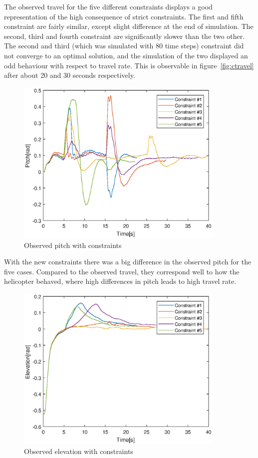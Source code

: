 The observed travel for the five different constraints displays a good representation of the high consequence of strict constraints. The first and fifth constraint are fairly similar, except slight difference at the end of simulation. The second, third and fourth constraint are significantly slower than the two other. The second and third (which was simulated with 80 time steps) constraint did not converge to an optimal solution, and the simulation of the two displayed an odd behaviour with respect to travel rate. This is observable in figure~\ref{fig:ctravel} after about 20 and 30 seconds respectively. 

\begin{figure}[H]
\includegraphics[width=1\linewidth, height=8cm]{data_10.4/constraints_p_eps.eps} 
\centering
\caption{Observed pitch with constraints}\label{fig:cpitch}
\end{figure}

With the new constraints there was a big difference in the observed pitch for the five cases. Compared to the observed travel, they correspond well to how the helicopter behaved, where high differences in pitch leads to high travel rate. 

\begin{figure}[H]
\includegraphics[width=1\linewidth, height=8cm]{data_10.4/constraints_e_eps.eps} 
\centering
\caption{Observed elevation with constraints}\label{fig:celev}
\end{figure}


